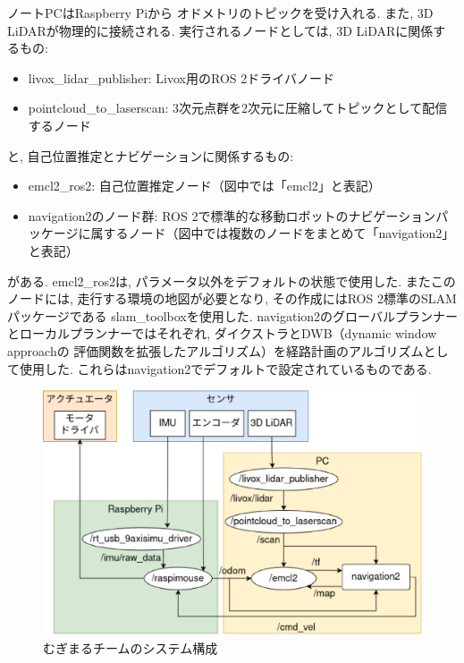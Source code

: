 ノートPCはRaspberry Piから
オドメトリのトピックを受け入れる. 
また, 3D LiDARが物理的に接続される. 
実行されるノードとしては, 3D LiDARに関係するもの: 
\begin{itemize}
	\item livox\_lidar\_publisher: Livox用のROS 2ドライバノード
	\item pointcloud\_to\_laserscan: 3次元点群を2次元に圧縮してトピックとして配信するノード
\end{itemize}
と, 自己位置推定とナビゲーションに関係するもの: 
\begin{itemize}
	\item emcl2\_ros2: 自己位置推定ノード（図中では「emcl2」と表記）
	\item navigation2\cite{nav2}のノード群: ROS 2で標準的な移動ロボットのナビゲーションパッケージに属するノード（図中では複数のノードをまとめて「navigation2」と表記）
\end{itemize}
がある. 
emcl2\_ros2は, パラメータ以外をデフォルトの状態で使用した. 
またこのノードには, 走行する環境の地図が必要となり, 
その作成にはROS 2標準のSLAMパッケージである
slam\_toolbox\cite{slam_toolbox}を使用した. 
navigation2のグローバルプランナーとローカルプランナーではそれぞれ, 
ダイクストラ\cite{dijkstra}とDWB（dynamic window approach\cite{dwa}の
評価関数を拡張したアルゴリズム）を経路計画のアルゴリズムとして使用した. 
これらはnavigation2でデフォルトで設定されているものである. 

\begin{figure}[h]
  \begin{center}
    \includegraphics[width=1.0\linewidth]{figs/mugimaru_system_2024.eps}
    \caption{むぎまるチームのシステム構成}
    \label{fig:mugimaru_system}
  \end{center}
\end{figure}


